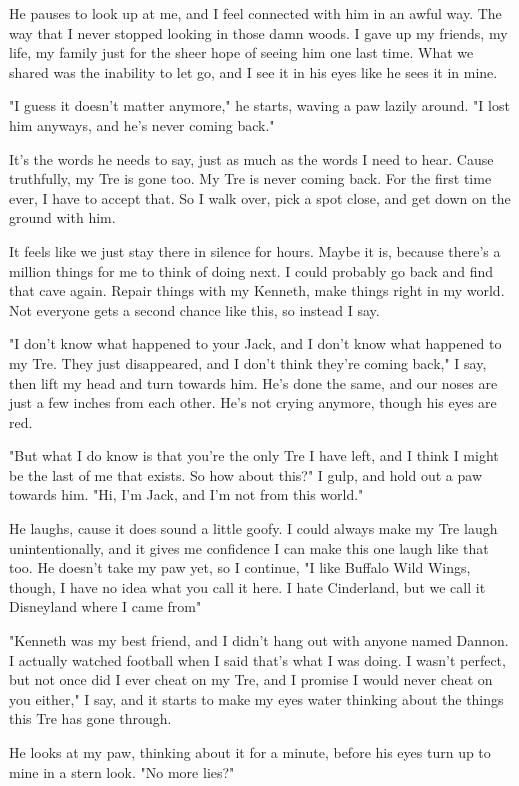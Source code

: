 He pauses to look up at me, and I feel connected with him in an awful way. The way that I never stopped looking in those damn woods. I gave up my friends, my life, my family just for the sheer hope of seeing him one last time. What we shared was the inability to let go, and I see it in his eyes like he sees it in mine.

"I guess it doesn't matter anymore," he starts, waving a paw lazily around. "I lost him anyways, and he's never coming back."

It's the words he needs to say, just as much as the words I need to hear. Cause truthfully, my Tre is gone too. My Tre is never coming back. For the first time ever, I have to accept that. So I walk over, pick a spot close, and get down on the ground with him.

It feels like we just stay there in silence for hours. Maybe it is, because there's a million things for me to think of doing next. I could probably go back and find that cave again. Repair things with my Kenneth, make things right in my world. Not everyone gets a second chance like this, so instead I say.

"I don't know what happened to your Jack, and I don't know what happened to my Tre. They just disappeared, and I don't think they're coming back," I say, then lift my head and turn towards him. He's done the same, and our noses are just a few inches from each other. He's not crying anymore, though his eyes are red.

"But what I do know is that you're the only Tre I have left, and I think I might be the last of me that exists. So how about this?" I gulp, and hold out a paw towards him. "Hi, I'm Jack, and I'm not from this world."

He laughs, cause it does sound a little goofy. I could always make my Tre laugh unintentionally, and it gives me confidence I can make this one laugh like that too. He doesn't take my paw yet, so I continue, "I like Buffalo Wild Wings, though, I have no idea what you call it here. I hate Cinderland, but we call it Disneyland where I came from"

"Kenneth was my best friend, and I didn't hang out with anyone named Dannon. I actually watched football when I said that's what I was doing. I wasn't perfect, but not once did I ever cheat on my Tre, and I promise I would never cheat on you either," I say, and it starts to make my eyes water thinking about the things this Tre has gone through.

He looks at my paw, thinking about it for a minute, before his eyes turn up to mine in a stern look. "No more lies?"

